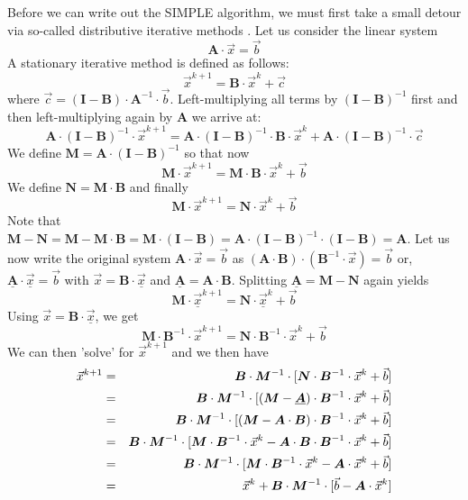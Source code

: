 Before we can write out the SIMPLE algorithm, we must first take a small detour via so-called
distributive iterative methods \cite{vusb00,tack10}. 
Let us consider the linear system 
\[
{\bm A}\cdot \vec{x}=\vec{b}
\] 
A stationary iterative method is defined as follows:
\[
\vec{x}^{k+1}= {\bm B}\cdot \vec{x}^{k}+ \vec{c}
\]
where $\vec{c}=({\bm I}-{\bm B})\cdot {\bm A}^{-1}\cdot \vec{b}$. 
Left-multiplying all terms by $({\bm I}-{\bm B})^{-1}$ first and then left-multiplying again 
by ${\bm A}$  we arrive at:
\[
{\bm A}\cdot ({\bm I}-{\bm B})^{-1}\cdot \vec{x}^{k+1}
={\bm A}\cdot ({\bm I}-{\bm B})^{-1}\cdot {\bm B}\cdot 
\vec{x}^{k} + {\bm A}\cdot ({\bm I}-{\bm B})^{-1} \cdot \vec{c}
\]
We define ${\bm M}={\bm A}\cdot ({\bm I}-{\bm B})^{-1} $ so that now
\[
{\bm M}\cdot\vec{x}^{k+1}={\bm M}\cdot {\bm B}\cdot \vec{x}^{k}+\vec{b} 
\]
We define ${\bm N}={\bm M}\cdot {\bm B}$
and finally 
\[
{\bm M}\cdot\vec{x}^{k+1}={\bm N}\cdot \vec{x}^{k}+\vec{b} 
\]
Note that ${\bm M}-{\bm N}={\bm M}-{\bm M}\cdot {\bm B}
= {\bm M}\cdot  ({\bm I}-{\bm B}) 
= {\bm A}\cdot ({\bm I}-{\bm B})^{-1}\cdot ({\bm I}-{\bm B}) 
= {\bm A}$. 
Let us now write the original system 
${\bm A}\cdot \vec{x}=\vec{b}$ as $({\bm A}\cdot {\bm B})\cdot ({\bm B}^{-1}\cdot \vec{x})=\vec{b}$
or, $ \underline{\bm A}\cdot  \underline{\vec{x}}=\vec{b} $
with 
$\vec{x}={\bm B}\cdot \underline{\vec{x}}$
and 
$\underline{\bm A}={\bm A}\cdot {\bm B}$.
Splitting $\underline{\bm A}={\bm M}-{\bm N}$ again yields 
\[
{\bm M}\cdot \underline{\vec{x}}^{k+1}={\bm N}\cdot \underline{\vec{x}}^{k}+\vec{b} 
\]
Using $\vec{x}={\bm B}\cdot \underline{\vec{x}}$, we get 
\[
{\bm M}\cdot {\bm B}^{-1}\cdot \vec{x}^{k+1} = {\bm N}\cdot {\bm B}^{-1}\cdot  \vec{x}^{k}+\vec{b} 
\]
We can then 'solve' for $\vec{x}^{k+1}$ and we then have 
\begin{eqnarray}
\vec{x}^{k+1}
&=&  {\bm B}\cdot {\bm M}^{-1} \cdot[ {\bm N} \cdot  {\bm B}^{-1}  \cdot \vec{x}^{k}+ \vec{b}  ] \nonumber\\
&=&  {\bm B}\cdot {\bm M}^{-1} \cdot[ ({\bm M} - \underline{\bm A}) \cdot  {\bm B}^{-1}\cdot \vec{x}^{k}+\vec{b}  ]\nonumber\\
&=&  {\bm B}\cdot {\bm M}^{-1} \cdot[ ({\bm M} - {\bm A}\cdot {\bm B}) \cdot  {\bm B}^{-1}\cdot  \vec{x}^{k}+ \vec{b}  ]\nonumber\\
&=&  {\bm B}\cdot {\bm M}^{-1} \cdot[ {\bm M}\cdot {\bm B}^{-1} \cdot \vec{x}^{k} - {\bm A}\cdot {\bm B}\cdot  {\bm B}^{-1} \cdot \vec{x}^{k}+\vec{b}  ]\nonumber\\
&=&  {\bm B}\cdot {\bm M}^{-1} \cdot[ {\bm M}\cdot {\bm B}^{-1} \cdot \vec{x}^{k} - {\bm A}\cdot \vec{x}^{k}+ \vec{b}  ]\nonumber\\
&=&  \vec{x}^k + {\bm B}\cdot {\bm M}^{-1}\cdot [ \vec{b}    - {\bm A} \cdot \vec{x}^{k}  ] \nonumber
\end{eqnarray}
